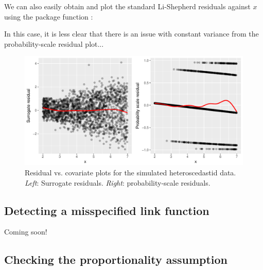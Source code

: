 We can also easily obtain and plot the standard Li-Shepherd residuals against $x$ using the  package function :

In this case, it is less clear that there is an issue with constant variance from the probability-scale residual plot...

\begin{figure}[!htbp]
  \centering
  \includegraphics[width=1\textwidth]{heteroscedasticity}
  \caption{Residual vs. covariate plots for the simulated heteroscedastid data. \textit{Left}: Surrogate residuals. \textit{Right}: probability-scale residuals.}
  \label{fig:heteroscedasticity}
\end{figure}


\subsection{Detecting a misspecified link function}

Coming soon!


\subsection{Checking the proportionality assumption}

